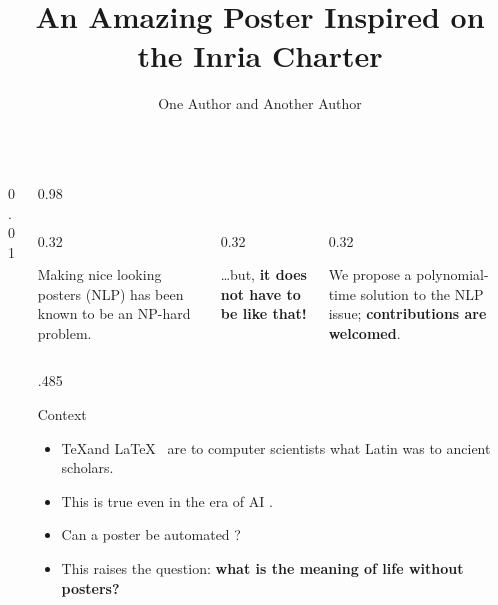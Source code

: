 \documentclass[final,svgnames,english]{beamer}
\title{An Amazing Poster Inspired on the Inria Charter}
\author{One Author and Another Author}
\institute[]{Inria Chile Research Center, Las Condes, Santiago, Chile. \url{https://inria.cl} --- \url{first.last@inria.cl}}
\begin{document}
\begin{frame}[fragile]{}
  \vspace{-2em}
  \begin{columns}[T]
    \begin{column}{0.01\linewidth}
    \end{column}

    \begin{column}{0.98\linewidth}
      \begin{columns}[t]
        \begin{column}{0.32\linewidth}
          \begin{inriablock}{}
            \large Making nice looking posters (NLP) has been known to be an NP-hard problem.\raggedright
          \end{inriablock}
        \end{column}%
        \begin{column}{0.32\linewidth}
          \begin{inriablock}{}
            \large \ldots but, \tcblower \large \textbf{it does not have to be like that!}
          \end{inriablock}
        \end{column}%
        \begin{column}{0.32\linewidth}
          \begin{inriablock}{}
            \large We propose a polynomial-time solution to the NLP issue; \textcolor{inria-rouge}{\textbf{contributions are welcomed}}.
          \end{inriablock}
        \end{column}
      \end{columns}
      \begin{columns}[T]
        \begin{column}{.485\linewidth}
          \begin{inriastartblock}{Context}
            \begin{itemize}
              \item \TeX and \LaTeX\ \autocite{knuth:tex} are to  computer scientists what Latin was to ancient scholars.
              \item This is true even in the era of AI \autocite{russell2020artificial}.
              \item Can a poster be automated \autocite{hu2026postermeldmultiagentpapertopostergeneration}?
              \item This raises the question: \textbf{what is the meaning of life without posters?}

\end{itemize}
\end{inriastartblock}
\end{column}
\end{columns}
\end{column}
\end{columns}
\end{frame}
\end{document}
